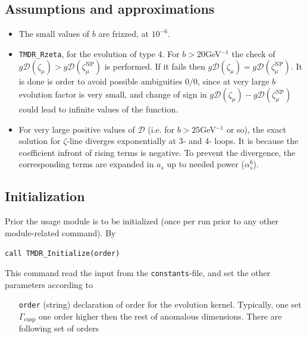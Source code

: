 \documentclass[prd,nofootinbib,eqsecnum,final]{revtex4}
\renewcommand{\(}{\left(}
\renewcommand{\)}{\right)}
\renewcommand{\[}{\left[}
\renewcommand{\]}{\right]}
\begin{document}
\subsection{Assumptions and approximations}

\begin{itemize}
\item The small values of $b$ are frizzed, at $10^{-6}$.
\item \texttt{TMDR{\_}Rzeta}, for the evolution of type 4. For $b>20$GeV$^{-1}$ the check of $g\mathcal{D}(\zeta_\mu)>g\mathcal{D}(\zeta_\mu^{\text{NP}})$ is performed. If it fails then $g\mathcal{D}(\zeta_\mu)=g\mathcal{D}(\zeta_\mu^{\text{NP}})$. It is done is order to avoid possible ambiguities $0/0$, since at very large $b$ evolution factor is very small, and change of sign in $g\mathcal{D}(\zeta_\mu)-g\mathcal{D}(\zeta_\mu^{\text{NP}})$ could lead to infinite values of the function.
\item For very large positive values of $\mathcal{D}$ (i.e. for $b>25$GeV$^{-1}$ or so), the exact solution for $\zeta$-line diverges exponentially at 3- and 4- loops. It is because the coefficient infront of rising terms is negative. To prevent the divergence, the corresponding terms are expanded in $a_s$ up to needed power ($\alpha_s^6$).
\end{itemize}

\subsection{Initialization}
\label{TMDR:init}

Prior the usage module is to be initialized (once per run prior to any other module-related command). By

\texttt{call TMDR{\_}Initialize(order)}

This command read the input from the \texttt{constants}-file, and set the other parameters according to 
\begin{itemize}

\item[\texttt{order}] (string) declaration of order for the evolution kernel. Typically, one set $\Gamma_{\text{cusp}}$ one order higher then the rest of anomalous dimensions. There are following set of orders
\end{itemize}
\end{document}
